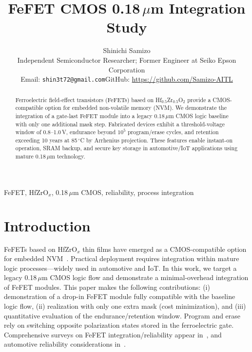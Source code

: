 \documentclass[journal]{IEEEtran}
\begin{document}
\title{FeFET CMOS 0.18\,$\mu$m Integration Study}
\author{Shinichi Samizo\\
\small Independent Semiconductor Researcher; Former Engineer at Seiko Epson Corporation\\
\small Email: \texttt{shin3t72@gmail.com}\quad GitHub: \url{https://github.com/Samizo-AITL}
}
\maketitle

\begin{abstract}
Ferroelectric field-effect transistors (FeFETs) based on Hf$_{0.5}$Zr$_{0.5}$O$_2$ provide a CMOS-compatible option for embedded non-volatile memory (NVM). We demonstrate the integration of a gate-last FeFET module into a legacy 0.18\,$\mu$m CMOS logic baseline with only one additional mask step. Fabricated devices exhibit a threshold-voltage window of 0.8–1.0\,V, endurance beyond $10^5$ program/erase cycles, and retention exceeding 10 years at 85\,$^\circ$C by Arrhenius projection. These features enable instant-on operation, SRAM backup, and secure key storage in automotive/IoT applications using mature 0.18\,$\mu$m technology.
\end{abstract}

\begin{IEEEkeywords}
FeFET, HfZrO$_x$, 0.18\,$\mu$m CMOS, reliability, process integration
\end{IEEEkeywords}

\section{Introduction}
FeFETs based on HfZrO$_x$ thin films have emerged as a CMOS-compatible option for embedded NVM~\cite{Boscke2011,Mueller2012,Schenk2019}. Practical deployment requires integration within mature logic processes—widely used in automotive and IoT. In this work, we target a legacy 0.18\,$\mu$m CMOS logic flow and demonstrate a minimal-overhead integration of FeFET modules. This paper makes the following contributions: (i) demonstration of a drop-in FeFET module fully compatible with the baseline logic flow, (ii) realization with only one extra mask (cost minimization), and (iii) quantitative evaluation of the endurance/retention window. Program and erase rely on switching opposite polarization states stored in the ferroelectric gate. Comprehensive surveys on FeFET integration/reliability appear in~\cite{Mueller2012,Mueller2015}, and automotive reliability considerations in~\cite{Nakamura2003}.
\end{document}
